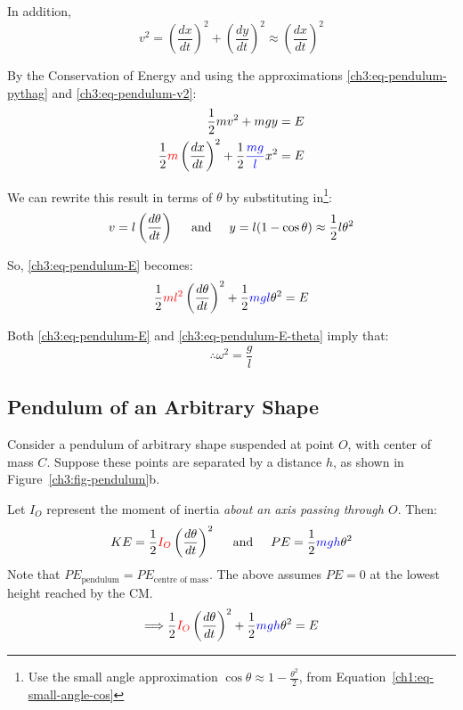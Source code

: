 In addition,
\begin{equation}
v^2=\left( \frac{dx}{dt} \right)^2 + \left(\frac{dy}{dt} \right)^2
\approx  \left( \frac{dx}{dt} \right)^2 \label{ch3:eq-pendulum-v2}
\end{equation}

By the Conservation of Energy and using the approximations \eqref{ch3:eq-pendulum-pythag} and  \eqref{ch3:eq-pendulum-v2}:
\begin{align}
\frac{1}{2} mv^2 + mgy &= E \notag \\
\frac{1}{2} \textcolor{red}{m} \left( \frac{dx}{dt} \right)^2 + \frac{1}{2} \textcolor{blue}{\frac{mg}{l}} x^2 &= E  \label{ch3:eq-pendulum-E}
\end{align}


We can rewrite this result in terms of $\theta$ by substituting in\footnote{Use the small angle approximation $\cos\theta \approx 1-\frac{\theta^2}{2}$, from Equation~\eqref{ch1:eq-small-angle-cos}}:
\begin{equation*}
v = l\left(\frac{d\theta}{dt}\right) \hspace{0.5cm}\text{and}\hspace{0.5cm}
y = l(1-\cos\theta) \approx \frac{1}{2}l\theta ^2
\end{equation*}

So, \eqref{ch3:eq-pendulum-E} becomes:
\begin{equation}
	\frac{1}{2} \textcolor{red}{ml^2} \left( \frac{d\theta}{dt} \right)^2 + \frac{1}{2} \textcolor{blue}{mgl} \theta^2 = E \label{ch3:eq-pendulum-E-theta}
\end{equation}

Both \eqref{ch3:eq-pendulum-E} and \eqref{ch3:eq-pendulum-E-theta} imply that:
\begin{equation}
	\therefore \omega^2 = \frac{g}{l} \label{ch3:eq-simple-pendulum-result}
\end{equation}


\subsection{Pendulum of an Arbitrary Shape} \label{ch3:sec-complex-pendulum}
Consider a pendulum of arbitrary shape suspended at point $O$, with center of mass $C$. Suppose these points are separated by a distance $h$, as shown in Figure~\ref{ch3:fig-pendulum}b.

Let $I_O$ represent the moment of inertia \emph{about an axis passing through $O$}. Then:
\begin{equation*}
KE = \frac{1}{2} \textcolor{red}{I_O}\left( \frac{d\theta}{dt} \right)^2 \hspace{0.5cm}\text{and}\hspace{0.5cm}
PE = \frac{1}{2} \textcolor{blue}{mgh}\theta^2 
\end{equation*}
Note that $PE_\text{pendulum} = PE_\text{centre of mass}$. The above assumes $PE = 0$ at the lowest height reached by the CM.
\begin{equation} 
	\Longrightarrow
	\frac{1}{2} \textcolor{red}{I_O}\left( \frac{d\theta}{dt} \right)^2 + \frac{1}{2} \textcolor{blue}{mgh}\theta^2 = E \label{ch3:eq-pendulumEO}
\end{equation}

